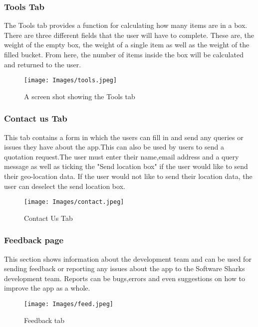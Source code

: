\documentclass[a4paper, 12pt]{article}
\begin{document}
\subsubsection{Tools Tab}
The Tools tab provides a function for calculating how many items are in a box.\\
There are three different fields that the user will have to complete. These are, the weight of the empty box, the weight of a single item as well as the weight of the filled bucket. From here, the number of items inside the box will be calculated and returned to the user.
\begin{figure}
\texttt{[image: Images/tools.jpeg]}
\centering
\caption{A screen shot showing the Tools tab} 
\end{figure}

\pagebreak

\subsubsection{Contact us Tab}

This tab contains a form in which the users can fill in and send any queries or issues they have about the app.This can also be used by users to send a quotation request.The user must enter their name,email address and a query message as well as ticking the "Send location box" if the user would like to send their geo-location data. If the user would not like to send their location data, the user can deselect the send location box. 
\begin{figure}[!ht]
\texttt{[image: Images/contact.jpeg]}
\centering
\caption{Contact Us Tab} 
\end{figure}

\subsubsection{Feedback page}

This section shows information about the development team and can be used for sending feedback or reporting any issues about the app to the Software Sharks development team. Reports can be bugs,errors and even suggestions on how to improve the app as a whole. 
\begin{figure}[!ht]
\texttt{[image: Images/feed.jpeg]}
\centering
\caption{Feedback tab} 
\end{figure}
\newpage

\pagebreak
\end{document}
